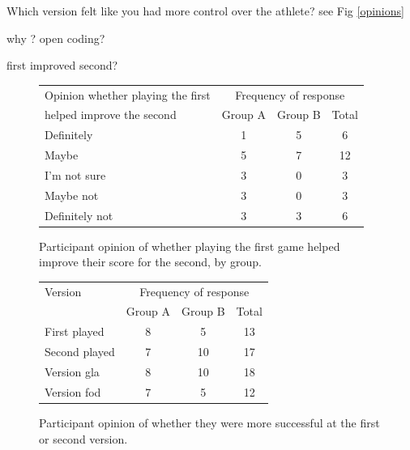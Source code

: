 \documentclass[12pt,a4paper,twoside,openright]{report}
\begin{document}
Which version felt like you had more control over the athlete?
see Fig \ref{opinions} 

why ? open coding?

first improved second?

\begin{figure}[tbh]
\begin{center}
\begin{tabular}{ |p{6cm}|c|c|c| }
  \hline
Opinion whether playing the first& \multicolumn{3}{|c|}{Frequency of response} \\ \cline{2-4}
helped improve the second& Group A& Group B&Total\\ \hline
Definitely     & 1 & 5 & 6 \\ \hline
Maybe          & 5 & 7 & 12\\ \hline
I'm not sure   & 3 & 0 & 3 \\ \hline
Maybe not      & 3 & 0 & 3 \\ \hline
Definitely not & 3 & 3 & 6 \\ \hline
\end{tabular}
\end{center}
\caption{Participant opinion of whether playing the first game helped improve their score for the second, by group.}
\label{firstHelpedSecond}
\end{figure}


\begin{figure}[tbh]
\begin{center}
\begin{tabular}{ |p{6cm}|c|c|c| }
  \hline
Version& \multicolumn{3}{|c|}{Frequency of response} \\ \cline{2-4}
& Group A& Group B&Total\\ \hline\hline
First played   & 8 & 5  & 13 \\ \hline
Second played  & 7 & 10 & 17 \\ \hline\hline
Version gla    & 8 & 10 & 18 \\ \hline
Version fod    & 7 & 5  & 12 \\ \hline
\end{tabular}
\end{center}
\caption{Participant opinion of whether they were more successful at the first or second version.}
\label{successfull}
\end{figure}
\end{document}
